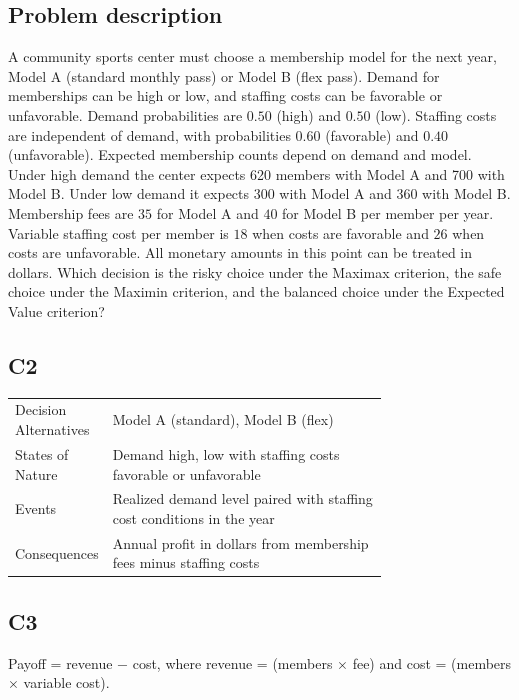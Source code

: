 		\item
		\subsection*{Problem description}
		A community sports center must choose a membership model for the next year, Model A (standard monthly pass)
		or Model B (flex pass). Demand for memberships can be high or low, and staffing costs can be favorable or unfavorable. Demand probabilities are $0.50$ (high) and $0.50$ (low). Staffing costs are independent of demand, with probabilities $0.60$ (favorable) and $0.40$ (unfavorable). Expected membership counts depend on demand and model. Under high demand the center expects 620 members with Model A and 700 with Model B. Under low demand it expects 300 with Model A and 360 with Model B. Membership fees are $35$ for Model A and $40$ for Model B per member per year. Variable staffing cost per member is $18$ when costs are favorable and $26$ when costs are unfavorable. All monetary amounts in this point can be treated in dollars. Which decision is the risky choice under the Maximax criterion, the safe choice under the Maximin criterion, and the balanced choice under the Expected Value criterion?

		\subsection*{C2}
		\begin{center}
			\begin{tabular}{l p{0.74\linewidth}}
				\toprule
				Decision Alternatives & Model A (standard), Model B (flex) \\
				States of Nature & Demand high, low with staffing costs favorable or unfavorable \\
				Events & Realized demand level paired with staffing cost conditions in the year \\
				Consequences & Annual profit in dollars from membership fees minus staffing costs \\
				\bottomrule
			\end{tabular}
		\end{center}

		\subsection*{C3}
		Payoff = revenue $-$ cost, where revenue = (members $\times$ fee) and cost = (members $\times$ variable cost).

